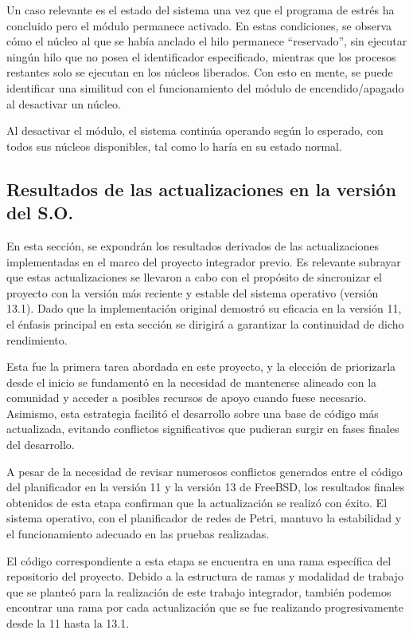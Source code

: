 Un caso relevante es el estado del sistema una vez que el programa de estrés ha concluido pero el módulo permanece activado. En estas condiciones, se observa cómo el núcleo al que se había anclado el hilo permanece “reservado”, sin ejecutar ningún hilo que no posea el identificador especificado, mientras que los procesos restantes solo se ejecutan en los núcleos liberados. Con esto en mente, se puede identificar una similitud con el funcionamiento del módulo de encendido/apagado al desactivar un núcleo.\par

Al desactivar el módulo, el sistema continúa operando según lo esperado, con todos sus núcleos disponibles, tal como lo haría en su estado normal.

\subsection{Resultados de las actualizaciones en la versión del S.O.}
En esta sección, se expondrán los resultados derivados de las actualizaciones implementadas en el marco del proyecto integrador previo. Es relevante subrayar que estas actualizaciones se llevaron a cabo con el propósito de sincronizar el proyecto con la versión más reciente y estable del sistema operativo (versión 13.1). Dado que la implementación original demostró su eficacia en la versión 11, el énfasis principal en esta sección se dirigirá a garantizar la continuidad de dicho rendimiento.\par

Esta fue la primera tarea abordada en este proyecto, y la elección de priorizarla desde el inicio se fundamentó en la necesidad de mantenerse alineado con la comunidad y acceder a posibles recursos de apoyo cuando fuese necesario. Asimismo, esta estrategia facilitó el desarrollo sobre una base de código más actualizada, evitando conflictos significativos que pudieran surgir en fases finales del desarrollo.\par

A pesar de la necesidad de revisar numerosos conflictos generados entre el código del planificador en la versión 11 y la versión 13 de FreeBSD, los resultados finales obtenidos de esta etapa confirman que la actualización se realizó con éxito. El sistema operativo, con el planificador de redes de Petri, mantuvo la estabilidad y el funcionamiento adecuado en las pruebas realizadas.\par

El código correspondiente a esta etapa se encuentra en una rama específica del repositorio del proyecto. Debido a la estructura de ramas y modalidad de trabajo que se planteó para la realización de este trabajo integrador, también podemos encontrar una rama por cada actualización que se fue realizando progresivamente desde la 11 hasta la 13.1.\par

